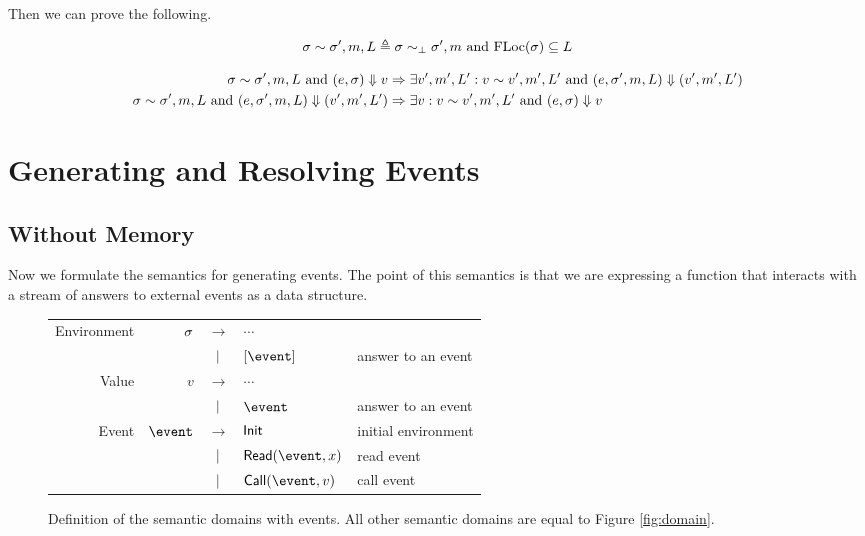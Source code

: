 \documentclass{article}
\begin{document}
Then we can prove the following.

\begin{definition}
  \[\sigma\sim\sigma',m,L\triangleq\sigma\sim_\bot\sigma',m\text{ and }\text{FLoc}(\sigma)\subseteq L\]
\end{definition}

\begin{thm}
  \begin{align*}
    \sigma\sim\sigma',m,L\text{ and }(e,\sigma)\Downarrow v                    & \Rightarrow\exists v',m',L':v\sim v',m',L'\text{ and }(e,\sigma',m,L)\Downarrow(v',m',L') \\
    \sigma\sim\sigma',m,L\text{ and }(e,\sigma',m,L)\Downarrow(v',m',L') & \Rightarrow\exists v:v\sim v',m',L'\text{ and }(e,\sigma)\Downarrow v
  \end{align*}
\end{thm}

\section{Generating and Resolving Events}

\subsection{Without Memory}
Now we formulate the semantics for generating events.
The point of this semantics is that we are expressing a function that interacts with a stream of answers to external events as a data structure.

\begin{figure}[h!]
  \centering
  \begin{tabular}{rrcll}
    Environment & $\sigma$   & $\rightarrow$ & $\cdots$                                 \\
                &          & $|$       & $[\event]$         & answer to an event  \\
    Value       & $v$      & $\rightarrow$ & $\cdots$                                 \\
                &          & $|$       & $\event$           & answer to an event  \\
    Event       & $\event$ & $\rightarrow$ & $\textsf{Init}$           & initial environment \\
                &          & $|$       & $\ReadE(\event,x)$ & read event          \\
                &          & $|$       & $\CallE(\event,v)$ & call event
  \end{tabular}
  \caption{Definition of the semantic domains with events. All other semantic domains are equal to Figure \ref{fig:domain}.}
  \label{fig:eventdomain}
\end{figure}
\end{document}
